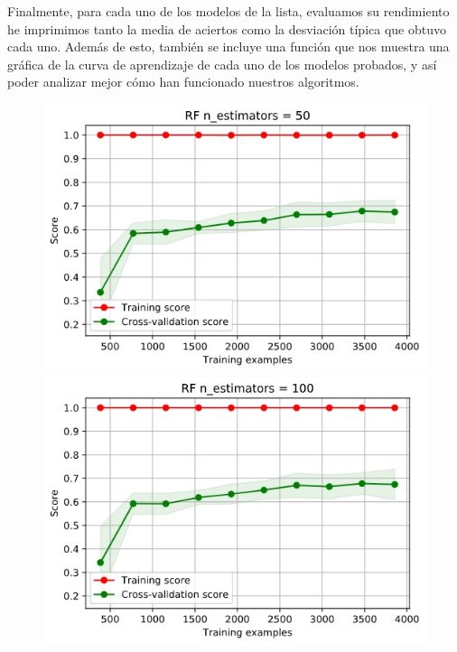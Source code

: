\documentclass[11pt,a4paper]{article}
\begin{document}
Finalmente, para cada uno de los modelos de la lista, evaluamos su rendimiento he imprimimos tanto la media de aciertos como la
desviación típica que obtuvo cada uno. Además de esto, también se incluye una función que nos muestra una gráfica de la curva de
aprendizaje de cada uno de los modelos probados, y así poder analizar mejor cómo han funcionado nuestros algoritmos.

\begin{figure}[H]
    \centering
    
    \begin{minipage}{0.5\textwidth}
        \centering
        \includegraphics[scale=0.35]{img/lc1.png}
    \end{minipage}%
    \begin{minipage}{0.5\textwidth}
        \centering
        \includegraphics[scale=0.35]{img/lc2.png}
    \end{minipage}
    
\end{figure}
    
\end{document}
